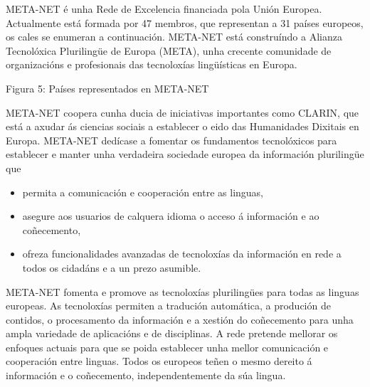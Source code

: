 \begin{multicols}{2}

   META-NET é unha Rede de Excelencia financiada pola Unión Europea. Actualmente está formada por 47 membros, que representan a 31 países europeos, os cales se enumeran a continuación. META-NET está construíndo a Alianza Tecnolóxica Plurilingüe de Europa (META), unha crecente comunidade de organizacións e profesionais das tecnoloxías lingüísticas en Europa. 

	Figura 5: Países representados en META-NET

META-NET coopera cunha ducia de iniciativas importantes como CLARIN, que está a axudar ás ciencias sociais a establecer o eido das Humanidades Dixitais en Europa. META-NET dedícase a fomentar os fundamentos tecnolóxicos para establecer e manter unha verdadeira sociedade europea da información plurilingüe que

\begin{itemize}

	\item permita a comunicación e cooperación entre as linguas, 
	\item asegure aos usuarios de calquera idioma o acceso á información e ao coñecemento,
	\item ofreza funcionalidades avanzadas de tecnoloxías da información en rede a todos os cidadáns e a un prezo asumible. 
\end{itemize}

META-NET fomenta e promove as tecnoloxías plurilingües para todas as linguas europeas. As tecnoloxías permiten a tradución automática, a produción de contidos, o procesamento da información e a xestión do coñecemento para unha ampla variedade de aplicacións e de disciplinas. A rede pretende mellorar os enfoques actuais para que se poida establecer unha mellor comunicación e cooperación entre linguas. Todos os europeos teñen o mesmo dereito á información e o coñecemento, independentemente da súa lingua. 


\end{multicols}
\cleardoublepage



